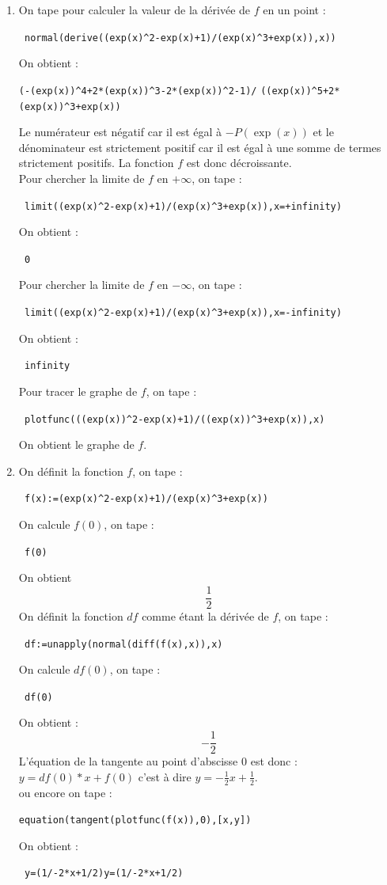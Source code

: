 \documentclass{article}
\begin{document}
\begin{giacjshere}
\begin{enumerate}
\item 
On tape pour calculer la valeur de la d\'eriv\'ee de $f$ en un point :
\begin{center}\verb| normal(derive((exp(x)^2-exp(x)+1)/(exp(x)^3+exp(x)),x))|\end{center}
On obtient :
\begin{center}\verb|(-(exp(x))^4+2*(exp(x))^3-2*(exp(x))^2-1)/|
\verb|((exp(x))^5+2*(exp(x))^3+exp(x))|\end{center}

Le num\'erateur est n\'egatif car il est \'egal \`a $-P(\exp(x))$ et le 
d\'enominateur est strictement positif car il est \'egal \`a une somme de 
termes strictement positifs. La fonction $f$ est donc d\'ecroissante.\\
Pour chercher la limite de $f$ en $+\infty$, on tape :
\begin{center}
\verb| limit((exp(x)^2-exp(x)+1)/(exp(x)^3+exp(x)),x=+infinity)|
\end{center}
On obtient :
\begin{center}
\verb| 0|
\end{center}
Pour chercher la limite de $f$ en $-\infty$, on tape :
\begin{center}
\verb| limit((exp(x)^2-exp(x)+1)/(exp(x)^3+exp(x)),x=-infinity)|
\end{center}
On obtient :
\begin{center}
\verb| infinity|
\end{center}
Pour tracer le graphe de $f$, on tape :
\begin{center}
\verb| plotfunc(((exp(x))^2-exp(x)+1)/((exp(x))^3+exp(x)),x)|
\end{center}
On obtient le graphe de $f$.

\item 
On d\'efinit la fonction $f$, on tape :
\begin{center}
\verb| f(x):=(exp(x)^2-exp(x)+1)/(exp(x)^3+exp(x))|
\end{center}
On calcule $f(0)$, on tape :
\begin{center}
\verb| f(0)|
\end{center}
On obtient
$$\frac{1}{2}$$
On d\'efinit la fonction $df$ comme \'etant la d\'eriv\'ee de $f$, on tape :
\begin{center}
\verb| df:=unapply(normal(diff(f(x),x)),x)|
\end{center}
On calcule $df(0)$, on tape :
\begin{center}
\verb| df(0)|
\end{center}
On obtient :
$$-\frac{1}{2}$$
L'\'equation de la tangente au point d'abscisse $0$ est donc :\\
 $y=df(0)*x+f(0)$
c'est \`a dire $\displaystyle y=-\frac{1}{2}x+\frac{1}{2}$.\\
ou encore on tape :
\begin{center}
\verb|equation(tangent(plotfunc(f(x)),0),[x,y])|
\end{center}
On obtient :
\begin{center}
\verb| y=(1/-2*x+1/2)y=(1/-2*x+1/2)|
\end{center}


\end{enumerate}
\end{giacjshere}
\end{document}
